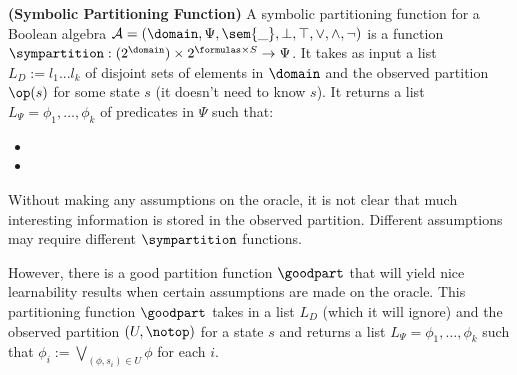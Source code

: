 \begin{definition}
\textbf{(Symbolic Partitioning Function)} 
A symbolic partitioning function for a Boolean algebra $\mathcal{A} = (\domain, \Psi, \sem{\_}, \bot, \top, \vee, \wedge, \neg)$ is a function $\sympartition : (2^\domain)\times 2^{\formulas \times S} \rightarrow \Psi$.
It takes as input a list $L_D := l_1 . . . l_k$ of disjoint sets of elements in $\domain$ and  the observed partition $\op(s)$ for some state $s$ (it doesn't need to know $s$).%
It returns a list $L_\Psi = \phi_1, \dots, \phi_k$ of predicates in $\Psi$ such that: 
\begin{itemize}
\item 
\item
\end{itemize}
\end{definition}

Without making any assumptions on the oracle, it is not clear that much interesting information is stored in the observed partition. 
Different assumptions may require different $\sympartition$ functions. 

However, there is a good partition function $\goodpart$ that will yield nice learnability results when certain assumptions are made on the oracle. 
This partitioning function $\goodpart$ takes in a list $L_D$ (which it will ignore) and the observed partition $(U, \notop)$ for a state $s$ and returns a list $L_\Psi = \phi_1, \dots, \phi_k$ such that $\phi_i := \bigvee_{(\phi, s_i) \in U}  \phi$ for each $i$.





